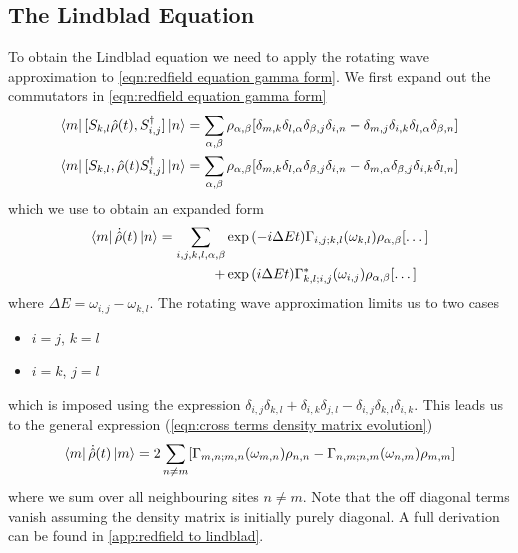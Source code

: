 \subsection{The Lindblad Equation}\label{sec:lindblad equation}
To obtain the Lindblad equation
we need to apply the rotating
wave approximation to
\cref{eqn:redfield equation gamma form}.
We first expand out the commutators
in \cref{eqn:redfield equation gamma form}
\begin{align}
    \bra{m}[S_{k, l}\hat{\rho}(t),
    S^\dagger_{i, j}] \ket{n}              & =
    \sum_{\alpha, \beta} \rho_{\alpha, \beta} [
        \delta_{m, k}\delta_{l, \alpha}
        \delta_{\beta, j}\delta_{i, n}
        -\delta_{m, j}\delta_{i, k}
    \delta_{l, \alpha}\delta_{\beta, n}]       \\
    \bra{m}[S_{k, l},
    \hat{\rho}(t)S^\dagger_{i, j}] \ket{n} & =
    \sum_{\alpha, \beta} \rho_{\alpha, \beta} [
        \delta_{m, k}\delta_{l, \alpha}
        \delta_{\beta, j}\delta_{i, n}
        -\delta_{m, \alpha}\delta_{\beta, j}
        \delta_{i, k}\delta_{l, n}]
\end{align}
which we use to obtain an expanded
form
\begin{equation}
    \bra{m}\dot{\hat{\rho}}(t) \ket{n} = \begin{aligned}[t]
        \sum_{i,j,k, l, \alpha, \beta} &
        \exp{(-i\Delta{}Et)}
        \Gamma_{i,j;k, l}(\omega_{k,l})
        \rho_{\alpha, \beta} [\dots]                          \\
        +                              & \exp{(i\Delta{}E t)}
        \Gamma^*_{k, l; i,j}(\omega_{i,j})
        \rho_{\alpha, \beta} [\dots]
    \end{aligned}
\end{equation}
where \(\Delta{}E = \omega_{i,j}-\omega_{k,l}\).
The rotating wave approximation
limits us to two cases
\begin{itemize}
    \item \(i=j\), \(k=l\)
    \item \(i=k\), \(j=l\)
\end{itemize}
which is imposed using the expression
\(\delta_{i,j}\delta_{k,l}
+ \delta_{i,k}\delta_{j,l}
- \delta_{i,j}\delta_{k,l}
\delta_{i,k}\). This
leads us to the
general expression (\cref{eqn:cross terms density matrix evolution})
\begin{equation}
    \bra{m}\dot{\hat{\rho}}(t) \ket{m}  =
    2 \sum_{n\neq m}
    [  \Gamma_{m,n;m, n}(\omega_{m,n})\rho_{n, n}
        - \Gamma_{n,m;n, m}(\omega_{n,m})\rho_{m, m}]
\end{equation}
where we sum over all neighbouring
sites \(n \neq m\). Note that
the off diagonal
terms vanish assuming the
density matrix is initially
purely diagonal. A full derivation
can be found in
\cref{app:redfield to lindblad}.



